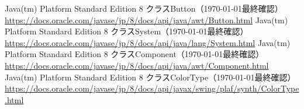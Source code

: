 \documentclass[a4j,11pt]{jsarticle}
\begin{document}
\newpage
\begin{thebibliography}{99}
     Java(tm) Platform Standard Edition 8 クラスButton（\today 最終確認）\\
    \url{https://docs.oracle.com/javase/jp/8/docs/api/java/awt/Button.html}
     Java(tm) Platform Standard Edition 8 クラスSystem（\today 最終確認）\\
    \url{https://docs.oracle.com/javase/jp/8/docs/api/java/lang/System.html}
     Java(tm) Platform Standard Edition 8 クラスComponent（\today 最終確認）\\
    \url{https://docs.oracle.com/javase/jp/8/docs/api/java/awt/Component.html}
     Java(tm) Platform Standard Edition 8 クラスColorType（\today 最終確認）\\
    \small\url{https://docs.oracle.com/javase/jp/8/docs/api/javax/swing/plaf/synth/ColorType.html}
\end{thebibliography}
\end{document}
